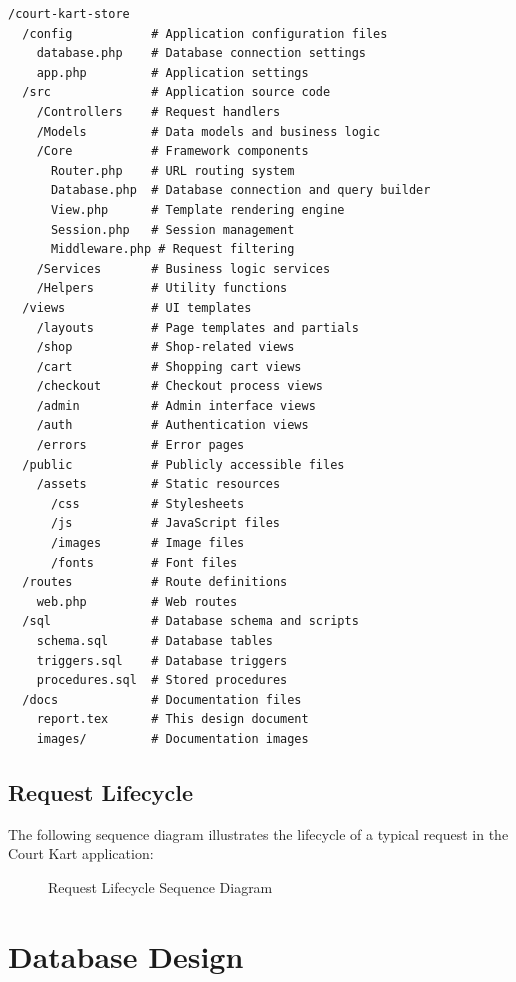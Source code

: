 \documentclass[14pt,a4paper]{article}
\begin{document}
\begin{lstlisting}[caption={Detailed Directory Structure}, label={lst:directory}]
/court-kart-store
  /config           # Application configuration files
    database.php    # Database connection settings
    app.php         # Application settings
  /src              # Application source code
    /Controllers    # Request handlers
    /Models         # Data models and business logic
    /Core           # Framework components
      Router.php    # URL routing system
      Database.php  # Database connection and query builder
      View.php      # Template rendering engine
      Session.php   # Session management
      Middleware.php # Request filtering
    /Services       # Business logic services
    /Helpers        # Utility functions
  /views            # UI templates
    /layouts        # Page templates and partials
    /shop           # Shop-related views
    /cart           # Shopping cart views
    /checkout       # Checkout process views
    /admin          # Admin interface views
    /auth           # Authentication views
    /errors         # Error pages
  /public           # Publicly accessible files
    /assets         # Static resources
      /css          # Stylesheets
      /js           # JavaScript files
      /images       # Image files
      /fonts        # Font files
  /routes           # Route definitions
    web.php         # Web routes
  /sql              # Database schema and scripts
    schema.sql      # Database tables
    triggers.sql    # Database triggers
    procedures.sql  # Stored procedures
  /docs             # Documentation files
    report.tex      # This design document
    images/         # Documentation images
\end{lstlisting}

\subsection{Request Lifecycle}
The following sequence diagram illustrates the lifecycle of a typical request in the Court Kart application:

\begin{figure}[H]
	\centering
	\caption{Request Lifecycle Sequence Diagram}
\end{figure}

\section{Database Design}
\end{document}
